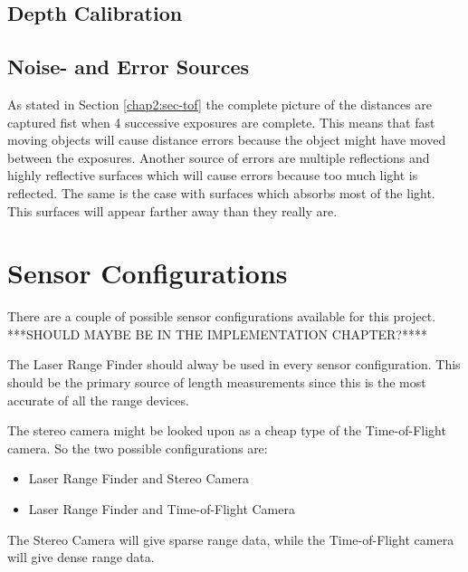 \subsection{Depth Calibration}




\subsection{Noise- and Error Sources}
As stated in Section \ref{chap2:sec-tof} the complete picture of the distances are
captured fist when 4 successive exposures are complete. This means that fast moving
objects will cause distance errors because the object might have moved between the
exposures. Another source of errors are multiple reflections and highly reflective
surfaces which will cause errors because too much light is reflected. The same is the case
with surfaces which absorbs most of the light. This surfaces will appear farther away than
they really are. 





\section{Sensor Configurations}
There are a couple of possible sensor configurations available for this project. ***SHOULD
MAYBE BE IN THE IMPLEMENTATION CHAPTER?****

The Laser Range Finder should alway be used in every sensor configuration. This should be
the primary source of length measurements since this is the most accurate of all the range
devices. 

The stereo camera might be looked upon as a cheap type of the Time-of-Flight camera. So
the two possible configurations are:
\begin{itemize}
    \item Laser Range Finder and Stereo Camera
    \item Laser Range Finder and Time-of-Flight Camera
\end{itemize}
The Stereo Camera will give sparse range data, while the Time-of-Flight camera will give
dense range data. 




